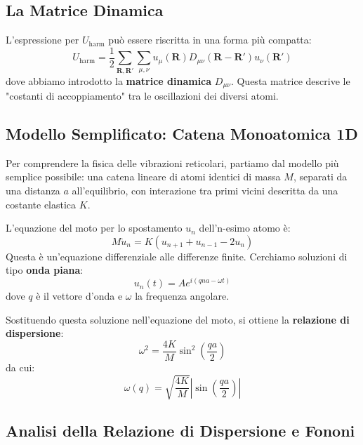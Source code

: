 \subsection{La Matrice Dinamica}

L'espressione per \(U_{\text{harm}}\) può essere riscritta in una forma più compatta:
\[ U_{\text{harm}} = \frac{1}{2} \sum_{\mathbf{R}, \mathbf{R'}} \sum_{\mu, \nu} u_\mu(\mathbf{R}) D_{\mu\nu}(\mathbf{R} - \mathbf{R'}) u_\nu(\mathbf{R'}) \]
dove abbiamo introdotto la \textbf{matrice dinamica} \(D_{\mu\nu}\). Questa matrice descrive le "costanti di accoppiamento" tra le oscillazioni dei diversi atomi. 

\subsection{Modello Semplificato: Catena Monoatomica 1D}

Per comprendere la fisica delle vibrazioni reticolari, partiamo dal modello più semplice possibile: una catena lineare di atomi identici di massa \(M\), separati da una distanza \(a\) all'equilibrio, con interazione tra primi vicini descritta da una costante elastica \(K\).

L'equazione del moto per lo spostamento \(u_n\) dell'n-esimo atomo è:
\[ M \ddot{u}_n = K(u_{n+1} + u_{n-1} - 2u_n) \]
Questa è un'equazione differenziale alle differenze finite. Cerchiamo soluzioni di tipo \textbf{onda piana}:
\[ u_n(t) = A e^{i(qna - \omega t)} \]
dove \(q\) è il vettore d'onda e \(\omega\) la frequenza angolare.

Sostituendo questa soluzione nell'equazione del moto, si ottiene la \textbf{relazione di dispersione}:
\[ \omega^2 = \frac{4K}{M} \sin^2\left(\frac{qa}{2}\right) \]
da cui:
\[ \omega(q) = \sqrt{\frac{4K}{M}} \left| \sin\left(\frac{qa}{2}\right) \right| \]

\subsection{Analisi della Relazione di Dispersione e Fononi}

